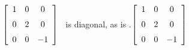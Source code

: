 {$\left[ \begin {array}{ccc} 1&0&0\\\noalign{\medskip}0&2&0
\\\noalign{\medskip}0&0&-1\end {array} \right] $} 
{\tta\ is diagonal, as is \ttat.$\left[ \begin {array}{ccc} 1&0&0\\\noalign{\medskip}0&2&0
\\\noalign{\medskip}0&0&-1\end {array} \right] 
$}


  

